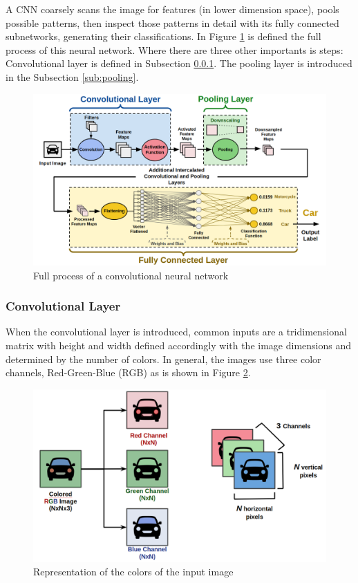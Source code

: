 A CNN coarsely scans the image for features (in lower dimension space), pools possible patterns, then inspect those patterns in detail with its fully connected
subnetworks, generating their classifications. In Figure \ref{fig:cnn_car} is defined the full process of this neural network. Where there are three other importants is steps: Convolutional layer is defined in Subsection \ref{sub:conv}. The pooling layer is introduced in the Subsection \ref{sub:pooling}.
\begin{figure}[H]
\centering
\includegraphics[width=\columnwidth]{imagens/Full_Process.png}
\caption{Full process of a convolutional neural network}
\label{fig:cnn_car}
\end{figure}


\subsubsection{Convolutional Layer}
\label{sub:conv}

When the convolutional layer is introduced, common inputs are a tridimensional matrix with height and width defined accordingly with the image dimensions and determined by the number of colors. In general, the images use three color channels, Red-Green-Blue (RGB) as is shown in Figure \ref{fig:rgb}.

\begin{figure}[H]
\centering
\includegraphics[scale=0.35]{imagens/rgb_representation.png}
\caption{Representation of the colors of the input image}
\label{fig:rgb}
\end{figure}


